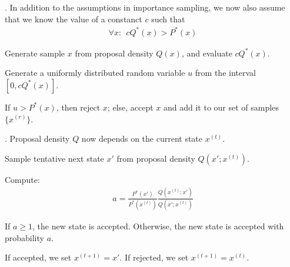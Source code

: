 \documentclass[11pt]{article}
\newcommand\myspace[1][]{\vspace{#1\bigskipamount}}
\newcommand\p{\Needspace{10\baselineskip} \noindent}
\begin{document}
\myspace
\p {}. In addition to the assumptions in importance sampling, we now also assume that we know the value of a constanct $c$ such that
\begin{align}
	\forall x: ~~	cQ^*(x) > P^*(x)
\end{align}
\begin{compactenum}
	\item Generate sample $x$ from proposal density $Q(x)$, and evaluate $c Q^*(x)$. 
	\item Generate a uniformly distributed random variable $u$ from the interval $[0, cQ^*(x)]$.
	\item If $u > P^*(x)$, then reject $x$; else, accept $x$ and add it to our set of samples $\{x^{(r)}\}$.
\end{compactenum}

\myspace
\p {}. Proposal density $Q$ now depends on the current state $x^{(t)}$.
\begin{compactenum}
	\item Sample tentative next state $x'$ from proposal density $Q(x'; x^{(t)})$.
	\item Compute:
	\begin{align}
		a = 
		\frac{  P^*(x') }{ P^*(x^{(t)}) }  
		\frac{ Q(x^{(t)}; x') }{ Q(x'; x^{(t)}) }
	\end{align}
	\item If $a \ge 1$, the new state is accepted. Otherwise, the new state is accepted with probability $a$. 
	\item If accepted, we set $x^{(t + 1)} = x'$. If rejected, we set $x^{(t+1)} = x^{(t)}$. 
\end{compactenum}



\begin{comment}
\lecture{Information Theory, Inference, and Learning Algorithms}{Exact Inference by Complete Enumeration (Ch. 21)}{November 18, 2017}

\p The brute-force inference method is complete enumeration of all hypotheses (LHS of posterior), and evaluation of their probabilities\footnote{Note: the author will tend to use the word ``hypothesis'' very casually and/or in the colloquial sense of the word.}. 
\end{comment}


\end{document}
